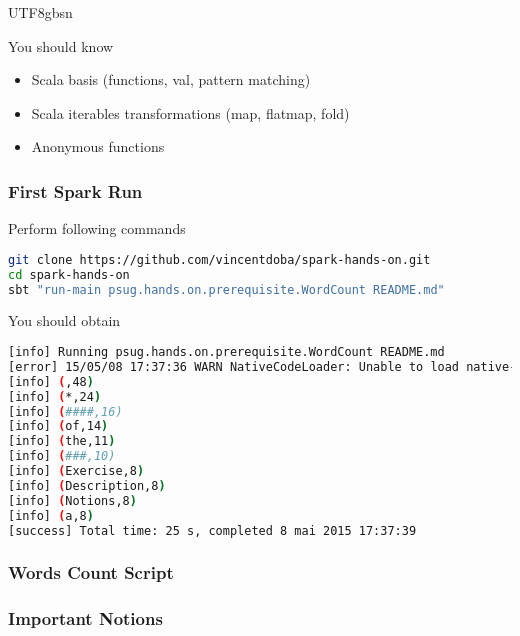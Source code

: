 \documentclass[slidetop,9pt,utf8]{beamer}
\begin{document}
\begin{CJK}{UTF8}{gbsn}
\begin{frame}
  \begin{block}{You should know}
    \begin{itemize}
      \item Scala basis (functions, val, pattern matching)
      \item Scala iterables transformations (map, flatmap, fold)
      \item Anonymous functions
    \end{itemize}
  \end{block}

\end{frame}

\begin{frame}[fragile]
  \frametitle{First Spark Run}

  \begin{block}{Perform following commands}
    \begin{lstlisting}[language=bash, style=terminal]
git clone https://github.com/vincentdoba/spark-hands-on.git
cd spark-hands-on
sbt "run-main psug.hands.on.prerequisite.WordCount README.md" 
    \end{lstlisting}
  \end{block}

  \begin{block}{You should obtain}
    \begin{lstlisting}[language=bash, style=terminal]
[info] Running psug.hands.on.prerequisite.WordCount README.md
[error] 15/05/08 17:37:36 WARN NativeCodeLoader: Unable to load native-hadoop library for your platform... using builtin-java classes where applicable
[info] (,48)
[info] (*,24)
[info] (####,16)
[info] (of,14)
[info] (the,11)
[info] (###,10)
[info] (Exercise,8)
[info] (Description,8)
[info] (Notions,8)
[info] (a,8)
[success] Total time: 25 s, completed 8 mai 2015 17:37:39
    \end{lstlisting}
  \end{block}

\end{frame}

\begin{frame}[fragile]
  \frametitle{Words Count Script}

  

\end{frame}

\begin{frame}
  \frametitle{Important Notions}


\end{frame}
\end{CJK}
\end{document}
